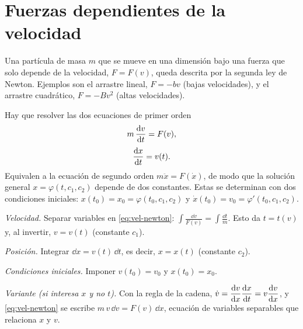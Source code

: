\section{Fuerzas dependientes de la velocidad}

Una partícula de masa $m$ que se mueve en una dimensión bajo una fuerza que solo depende de la velocidad, $F=F(v)$, queda descrita por la segunda ley de Newton. Ejemplos son el arrastre lineal, $F=-bv$ (bajas velocidades), y el arrastre cuadrático, $F=-Bv^2$ (altas velocidades).

\begin{modelo}[movimiento con $F=F(v)$]
Hay que resolver las dos ecuaciones de primer orden
\begin{equation}
  m\,\dfrac{\mathrm{d} v}{\mathrm{d} t}=F(v),
  \label{eq:vel-newton}
\end{equation}
\begin{equation}
  \dfrac{\mathrm{d} x}{\mathrm{d} t}=v(t).
  \label{eq:vel-posicion}
\end{equation}
Equivalen a la ecuación de segundo orden $m\ddot x=F(\dot x)$, de modo que la solución general $x=\varphi(t,c_1,c_2)$ depende de dos constantes. Estas se determinan con dos condiciones iniciales: $x(t_0)=x_0=\varphi(t_0,c_1,c_2)$ y $\dot x(t_0)=v_0=\varphi'(t_0,c_1,c_2)$.
\end{modelo}

\begin{algoritmo}[movimiento con $F=F(v)$]
\begin{pasos}
  \item \emph{Velocidad.} Separar variables en \eqref{eq:vel-newton}: $\displaystyle\int\frac{\dd v}{F(v)}=\int\frac{\dd t}{m}$. Esto da $t=t(v)$ y, al invertir, $v=v(t)$ (constante $c_1$).
  \item \emph{Posición.} Integrar $\dd x=v(t)\,\dd t$, es decir, $x=x(t)$ (constante $c_2$).
  \item \emph{Condiciones iniciales.} Imponer $v(t_0)=v_0$ y $x(t_0)=x_0$.
  \item \emph{Variante (si interesa $x$ y no $t$).} Con la regla de la cadena, $\dot v=\dfrac{\mathrm{d} v}{\mathrm{d} x}\dfrac{\mathrm{d} x}{\mathrm{d} t}=v\dfrac{\mathrm{d} v}{\mathrm{d} x}$, y \eqref{eq:vel-newton} se escribe $m\,v\,\dd v=F(v)\,\dd x$, ecuación de variables separables que relaciona $x$ y $v$.
\end{pasos}
\end{algoritmo}

